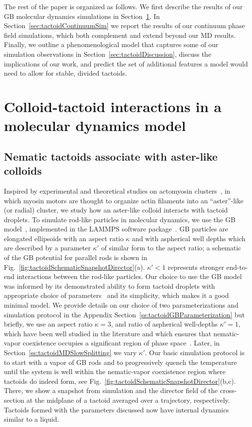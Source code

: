 \documentclass[%
 aip,
 amsmath,amssymb,
 reprint,%
]{revtex4-1}
\begin{document}
The rest of the paper is organized as follows. We first describe the results of our GB molecular dynamics simulations in Section~\ref{sec:tactoidMDSim}. In Section~\ref{sec:tactoidContinuumSim} we report the results of our continuum phase field simulations, which both complement and extend beyond our MD results. Finally, we outline a phenomenological model that captures some of our simulation observations in Section~\ref{sec:tactoidDiscussion}, discuss the implications of our work, and predict the set of additional features a model would need to allow for stable, divided tactoids.

\section{Colloid-tactoid interactions in a molecular dynamics model} \label{sec:tactoidMDSim}

\subsection{Nematic tactoids associate with aster-like colloids} \label{ss:tactoidMDFastParameters}

Inspired by experimental and theoretical studies on actomyosin clusters~\cite{Weirich19,Husain2017}, in which myosin motors are thought to organize actin filaments into an ``aster''-like (or radial) cluster, we study how an aster-like colloid interacts with tactoid droplets. To simulate rod-like particles in molecular dynamics, we use the GB model~\cite{GayBerne}, implemented in the LAMMPS software package~\cite{Plimpton95,Plimpton09}. GB particles are elongated ellipsoids with an aspect ratio $\kappa$ and with aspherical well depths which are described by a parameter $\kappa'$ of similar form to the aspect ratio; a schematic of the GB potential for parallel rods is shown in Fig.~\ref{fig:tactoidSchematicSnapshotDirector}(a). $\kappa' < 1$ represents stronger end-to-end interactions between the rod-like particles. Our choice to use the GB model was informed by its demonstrated ability to form tactoid droplets with appropriate choice of parameters~\cite{deMiguel97,Fernandez12,Zannoni12} and its simplicity, which makes it a good minimal model. We provide details on our choice of two parameterizations and simulation protocol in the Appendix Section~\ref{ss:tactoidGBParameterization} but briefly, we use an aspect ratio $\kappa=3$, and ratio of aspherical well-depths $\kappa'=1$, which have been well studied in the literature and which ensures that nematic-vapor coexistence occupies a significant region of phase space~\cite{deMiguel97}. Later, in Section~\ref{ss:tactoidMDSlowSplitting} we vary $\kappa'$. Our basic simulation protocol is to start with a vapor of GB rods and to progressively quench the temperature until the system is well within the nematic-vapor coexistence region where tactoids do indeed form, see Fig.~\ref{fig:tactoidSchematicSnapshotDirector}(b,c). There, we show a snapshot from simulation and the director field of the cross-section at the midplane of a tactoid averaged over a trajectory, respectively. Tactoids formed with the parameters discussed now have internal dynamics similar to a liquid.
\end{document}
